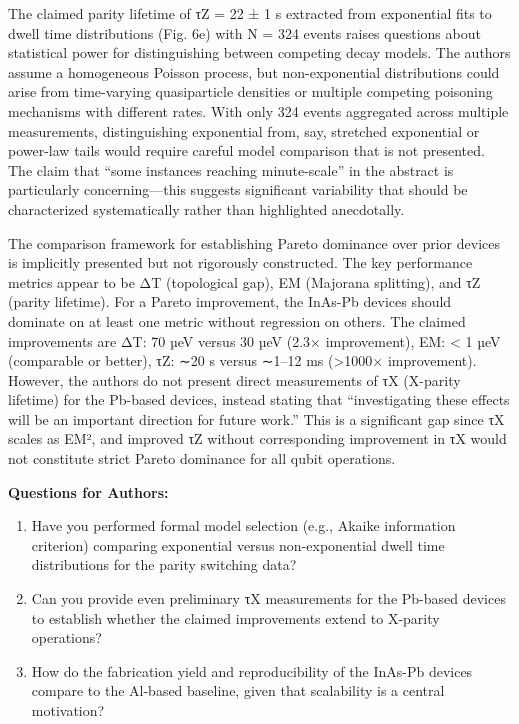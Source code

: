 \documentclass[10pt,letterpaper]{article}
\begin{document}
The claimed parity lifetime of τZ = 22 ± 1 s extracted from exponential fits to dwell time distributions (Fig. 6e) with N = 324 events raises questions about statistical power for distinguishing between competing decay models. The authors assume a homogeneous Poisson process, but non-exponential distributions could arise from time-varying quasiparticle densities or multiple competing poisoning mechanisms with different rates. With only 324 events aggregated across multiple measurements, distinguishing exponential from, say, stretched exponential or power-law tails would require careful model comparison that is not presented. The claim that ``some instances reaching minute-scale'' in the abstract is particularly concerning---this suggests significant variability that should be characterized systematically rather than highlighted anecdotally.

The comparison framework for establishing Pareto dominance over prior devices is implicitly presented but not rigorously constructed. The key performance metrics appear to be ΔT (topological gap), EM (Majorana splitting), and τZ (parity lifetime). For a Pareto improvement, the InAs-Pb devices should dominate on at least one metric without regression on others. The claimed improvements are ΔT: 70 µeV versus 30 µeV (2.3× improvement), EM: \textless{} 1 µeV (comparable or better), τZ: ∼20 s versus ∼1--12 ms (\textgreater1000× improvement). However, the authors do not present direct measurements of τX (X-parity lifetime) for the Pb-based devices, instead stating that ``investigating these effects will be an important direction for future work.'' This is a significant gap since τX scales as EM², and improved τZ without corresponding improvement in τX would not constitute strict Pareto dominance for all qubit operations.

\textbf{Questions for Authors:}

\begin{enumerate}
\def\labelenumi{\arabic{enumi}.}
\item
  Have you performed formal model selection (e.g., Akaike information criterion) comparing exponential versus non-exponential dwell time distributions for the parity switching data?
\item
  Can you provide even preliminary τX measurements for the Pb-based devices to establish whether the claimed improvements extend to X-parity operations?
\item
  How do the fabrication yield and reproducibility of the InAs-Pb devices compare to the Al-based baseline, given that scalability is a central motivation?
\end{enumerate}
\end{document}
